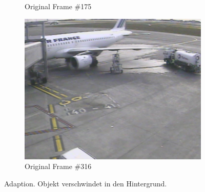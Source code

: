 \documentclass[]{scrartcl}
\begin{document}
\begin{figure}[h!]
\begin{subfigure}{.5\textwidth}
  \caption{Original Frame \#175}
  \label{fig:orig1}
\end{subfigure}%
\begin{subfigure}{.5\textwidth}
  \centering
  \includegraphics[width=.9\linewidth]{S36-A319-8_0316.jpeg}
  \caption{Original Frame \#316}
  \label{fig:orig2}
\end{subfigure}
\caption{Adaption. Objekt verschwindet in den Hintergrund.}
\label{fig:adaption}
\end{figure}




\end{document}
